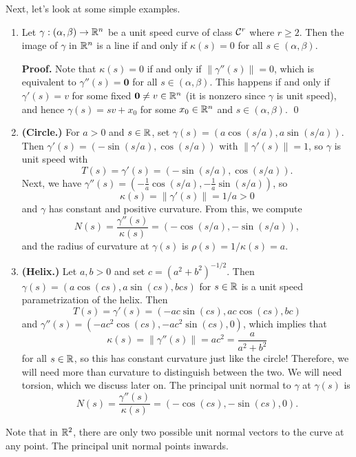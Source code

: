 Next, let's look at some simple examples. 
\begin{enumerate}[(1)]
    \item Let $\gamma : (\alpha, \beta) \to \mathbb{R}^n$ be a unit speed curve 
    of class ${\cal C}^r$ where $r \geq 2$. Then the image of $\gamma$ in $\mathbb{R}^n$ 
    is a line if and only if $\kappa(s) = 0$ for all $s \in (\alpha, \beta)$. 

    {\bf Proof.} Note that $\kappa(s) = 0$ if and only if $\|\gamma''(s)\| = 0$, 
    which is equivalent to $\gamma''(s) = \mathbf 0$ for all $s \in (\alpha, \beta)$. 
    This happens if and only if $\gamma'(s) = v$ for some fixed 
    $\mathbf 0 \neq v \in \mathbb{R}^n$ (it is nonzero since $\gamma$ is unit speed), and 
    hence $\gamma(s) = sv + x_0$ for some $x_0 \in \mathbb{R}^n$ and $s \in 
    (\alpha, \beta)$. \qed 

    \item {\bf (Circle.)} For $a > 0$ and $s \in \mathbb{R}$, set 
    $\gamma(s) = (a\cos(s/a), a\sin(s/a))$. Then $\gamma'(s) = 
    (-\sin(s/a), \cos(s/a))$ with $\|\gamma'(s)\| = 1$, so 
    $\gamma$ is unit speed with 
    \[ T(s) = \gamma'(s) = (-\sin(s/a), \cos(s/a)). \] 
    Next, we have $\gamma''(s) = (-\frac1a\cos(s/a), -\frac1a\sin(s/a))$, so 
    \[ \kappa(s) = \|\gamma'(s)\| = 1/a > 0 \] 
    and $\gamma$ has constant and positive curvature. From this, we compute 
    \[ N(s) = \frac{\gamma''(s)}{\kappa(s)} = (-\cos(s/a), -\sin(s/a)), \]
    and the radius of curvature at $\gamma(s)$ is $\rho(s) = 1/\kappa(s) = a$.  

    \item {\bf (Helix.)} Let $a, b > 0$ and set $c = (a^2 + b^2)^{-1/2}$. Then 
    $\gamma(s) = (a\cos(cs), a\sin(cs), bcs)$
    for $s \in \mathbb{R}$ is a unit speed parametrization of the helix. Then 
    \[ T(s) = \gamma'(s) = (-ac\sin(cs), ac\cos(cs), bc) \] 
    and $\gamma''(s) = (-ac^2\cos(cs), -ac^2\sin(cs), 0)$, which implies that 
    \[ \kappa(s) = \|\gamma''(s)\| = ac^2 = \frac{a}{a^2+b^2} \] 
    for all $s \in \mathbb{R}$, so this has constant curvature just like the circle! 
    Therefore, we will need more than curvature to distinguish between the two. 
    We will need torsion, which we discuss later on. The principal unit 
    normal to $\gamma$ at $\gamma(s)$ is 
    \[ N(s) = \frac{\gamma''(s)}{\kappa(s)} = (-\cos(cs), -\sin(cs), 0). \] 
\end{enumerate}
Note that in $\mathbb{R}^2$, there are only two possible unit normal vectors to the 
curve at any point. The principal unit normal points inwards. 

